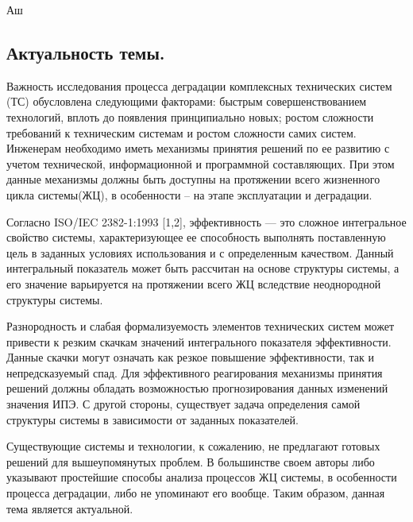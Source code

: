 
Аш\subsection{Актуальность темы.}
Важность исследования процесса деградации комплексных технических систем (ТС) обусловлена следующими факторами: быстрым совершенствованием технологий, вплоть до появления принципиально новых; ростом сложности требований к техническим системам и ростом сложности самих систем. 
Инженерам необходимо иметь механизмы принятия решений по ее развитию с учетом технической, информационной и программной составляющих.
При этом данные механизмы должны быть доступны на протяжении всего жизненного цикла системы(ЖЦ), в особенности – на этапе эксплуатации и деградации.

Согласно ISO/IEC 2382-1:1993 [1,2], эффективность — это сложное интегральное свойство системы, характеризующее ее способность выполнять поставленную цель в заданных условиях использования и с определенным качеством. 
Данный интегральный показатель может быть рассчитан на основе структуры системы, а его значение варьируется на протяжении всего ЖЦ вследствие неоднородной структуры системы. 

Разнородность и слабая формализуемость элементов технических систем может привести к резким скачкам значений интегрального показателя эффективности. 
Данные скачки могут означать как резкое повышение эффективности, так и непредсказуемый спад. 
Для эффективного реагирования механизмы принятия решений должны обладать возможностью прогнозирования данных изменений значения ИПЭ. С другой стороны, существует задача определения самой структуры системы в зависимости от заданных показателей.

Существующие системы и технологии, к сожалению, не предлагают готовых решений для вышеупомянутых проблем.
В большинстве своем авторы либо указывают простейшие способы анализа процессов ЖЦ системы, в особенности процесса деградации, либо не упоминают его вообще. 
Таким образом, данная тема является актуальной.

